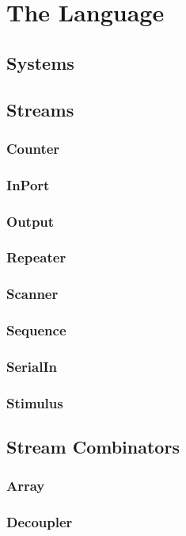 \chapter{The Language}

\section{Systems}

\section{Streams}
\subsection{Counter}
\subsection{InPort}
\subsection{Output}
\subsection{Repeater}
\subsection{Scanner}
\subsection{Sequence}
\subsection{SerialIn}
\subsection{Stimulus}

\section{Stream Combinators}
\subsection{Array}
\subsection{Decoupler}
